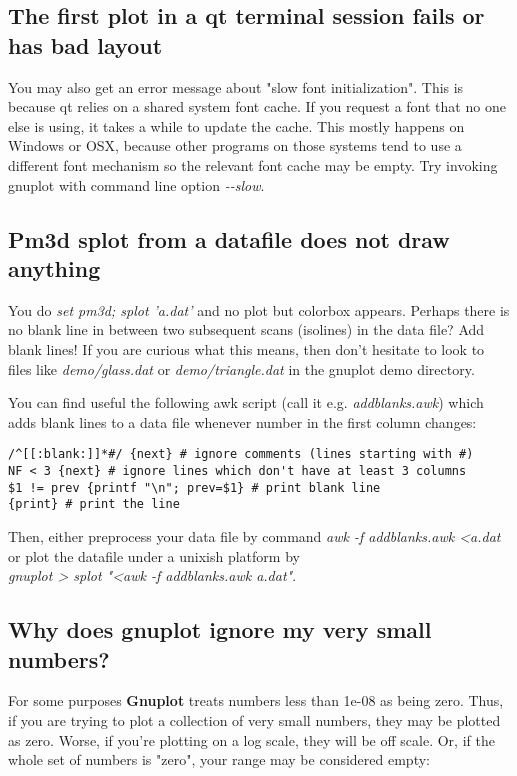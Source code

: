 \documentclass[a4paper,11pt]{article}
\newcommand{\gnuplot}{\textbf{gnuplot }}
\newcommand{\Gnuplot}{\textbf{Gnuplot }}
\begin{document}
\subsection{The first plot in a qt terminal session fails or has bad layout}

You may also get an error message about "slow font initialization".
This is because qt relies on a shared system font cache.
If you request a font that no one else is using, it takes a while to
update the cache.  This mostly happens on Windows or OSX, because other
programs on those systems tend to use a different font mechanism so the 
relevant font cache may be empty.
Try invoking gnuplot with command line option {\em -\@-slow}.

\subsection{Pm3d splot from a datafile does not draw anything}

You do {\em set pm3d; splot 'a.dat'} and no plot but colorbox appears.
Perhaps there is no blank line in between two subsequent scans (isolines) in
the data file? Add blank lines! If you are curious what this means, then don't
hesitate to look to files like {\em demo/glass.dat} or {\em demo/triangle.dat}
in the gnuplot demo directory.

You can find useful the following awk script (call it e.g. {\em addblanks.awk})
which adds blank lines to a data file whenever number in the first column
changes:
\small
\begin{verbatim}
/^[[:blank:]]*#/ {next} # ignore comments (lines starting with #)
NF < 3 {next} # ignore lines which don't have at least 3 columns
$1 != prev {printf "\n"; prev=$1} # print blank line
{print} # print the line
\end{verbatim}
\normalsize

Then, either preprocess your data file by command
{\em awk -f addblanks.awk <a.dat}
or plot the datafile under a unixish platform by\\
{\em gnuplot > splot "<awk -f addblanks.awk a.dat"}.

\subsection{Why does \gnuplot ignore my very small numbers?}

For some purposes \Gnuplot{} treats numbers less than 1e-08 as being zero.
Thus, if you are trying to plot a collection of very small
numbers, they may be plotted as zero. Worse, if you're plotting
on a log scale, they will be off scale. Or, if the whole set of
numbers is "zero", your range may be considered empty:
\end{document}
